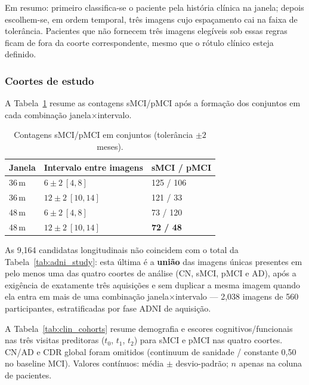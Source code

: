 \documentclass[review]{elsarticle}
\begin{document}
	Em resumo: primeiro classifica-se o paciente pela história clínica na janela; depois escolhem-se, em ordem temporal, três imagens cujo espaçamento cai na faixa de tolerância.
	Pacientes que não fornecem três imagens elegíveis sob essas regras ficam de fora da coorte correspondente, mesmo que o rótulo clínico esteja definido.
	
	
	\subsubsection{Coortes de estudo}
	\label{subsec:coortes}
	
	A Tabela~\ref{tab:coortes} resume as contagens sMCI/pMCI após a formação dos conjuntos em cada combinação janela$\times$intervalo.
	
	\begin{table}[htbp]
		\centering
		\caption{Contagens sMCI/pMCI em conjuntos (tolerância $\pm 2$ meses).}
		\label{tab:coortes}
		\begin{tabular}{lll}
			\toprule
			Janela & Intervalo entre imagens & sMCI / pMCI \\
			\midrule
			36\,m & $6\pm 2\ [4,8]$   & 125 / 106 \\
			36\,m & $12\pm 2\ [10,14]$ & 121 / 33 \\
			48\,m & $6\pm 2\ [4,8]$   & 73 / 120 \\
			48\,m & $12\pm 2\ [10,14]$ & \textbf{72 / 48} \\
			\bottomrule
		\end{tabular}
	\end{table}
	
	As 9{,}164 candidatas longitudinais não coincidem com o total da Tabela~\ref{tab:adni_study}: esta última é a \textbf{união} das imagens únicas presentes em pelo menos uma das quatro coortes de análise (CN, sMCI, pMCI e AD), após a exigência de exatamente três aquisições e sem duplicar a mesma imagem quando ela entra em mais de uma combinação janela$\times$intervalo --- 2{,}038 imagens de 560 participantes, estratificadas por fase ADNI de aquisição.
	
	A Tabela~\ref{tab:clin_cohorts} resume demografia e escores cognitivos/funcionais nas três visitas preditoras ($t_0$, $t_1$, $t_2$) para sMCI e pMCI nas quatro coortes.
	CN/AD e CDR global foram omitidos (continuum de sanidade / constante 0{,}50 no baseline MCI).
	Valores contínuos: média $\pm$ desvio-padrão; $n$ apenas na coluna de pacientes.
	
\end{document}
